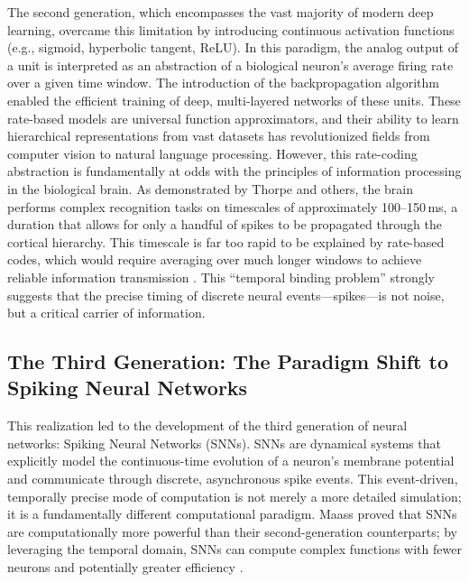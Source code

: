 The second generation, which encompasses the vast majority of modern deep learning, overcame this limitation by introducing continuous activation functions (e.g., sigmoid, hyperbolic tangent, ReLU). In this paradigm, the analog output of a unit is interpreted as an abstraction of a biological neuron's average firing rate over a given time window. The introduction of the backpropagation algorithm enabled the efficient training of deep, multi-layered networks of these units. These rate-based models are universal function approximators, and their ability to learn hierarchical representations from vast datasets has revolutionized fields from computer vision to natural language processing. However, this rate-coding abstraction is fundamentally at odds with the principles of information processing in the biological brain. As demonstrated by Thorpe and others, the brain performs complex recognition tasks on timescales of approximately 100--150\,ms, a duration that allows for only a handful of spikes to be propagated through the cortical hierarchy. This timescale is far too rapid to be explained by rate-based codes, which would require averaging over much longer windows to achieve reliable information transmission \cite{simon_j_thorpe_biological_1989}. This ``temporal binding problem'' strongly suggests that the precise timing of discrete neural events---spikes---is not noise, but a critical carrier of information.

\subsection{The Third Generation: The Paradigm Shift to Spiking Neural Networks}
This realization led to the development of the third generation of neural networks: Spiking Neural Networks (SNNs). SNNs are dynamical systems that explicitly model the continuous-time evolution of a neuron's membrane potential and communicate through discrete, asynchronous spike events. This event-driven, temporally precise mode of computation is not merely a more detailed simulation; it is a fundamentally different computational paradigm. Maass proved that SNNs are computationally more powerful than their second-generation counterparts; by leveraging the temporal domain, SNNs can compute complex functions with fewer neurons and potentially greater efficiency \cite{maass_networks_1997}.

